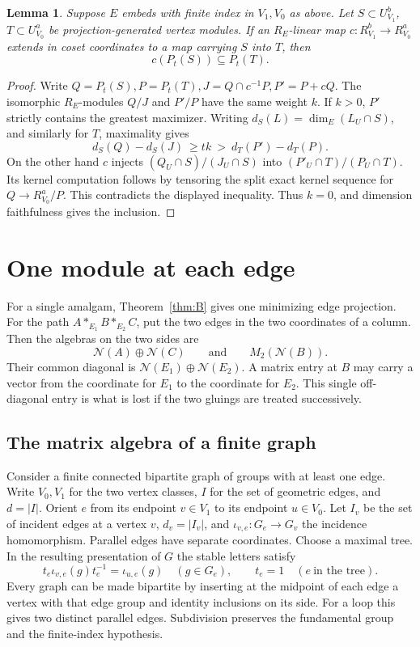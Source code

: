 \documentclass[11pt,a4paper,reqno]{amsart}
\numberwithin{equation}{section}
\newtheorem{lemma}[theorem]{Lemma}
\theoremstyle{remark}
\newcommand{\N}{\mathcal N}
\begin{document}
\begin{lemma}\label{lem:cmp}
Suppose \(E\) embeds with finite index in \(V_1,V_0\) as above. Let \(S\subset U_{V_1}^{b}\), \(T\subset U_{V_0}^{a}\) be projection-generated vertex modules. If an \(R_E\)-linear map \(c:R_{V_1}^{b}\to R_{V_0}^{a}\) extends in coset coordinates to a map carrying \(S\) into \(T\), then
\[
                        c(P_t(S))\subseteq P_t(T).
\]
\end{lemma}
\begin{proof}
Write \(Q=P_t(S), P=P_t(T), J=Q\cap c^{-1}P, P'=P+cQ\). The isomorphic \(R_E\)-modules \(Q/J\) and \(P'/P\) have the same weight \(k\). If \(k>0\), \(P'\) strictly contains the greatest maximizer. Writing \(d_S(L)=\dim_E(L_U\cap S)\), and similarly for \(T\), maximality gives
\[
             d_S(Q)-d_S(J)\ \ge tk\ >\ d_T(P')-d_T(P).
\]
On the other hand \(c\) injects \((Q_U\cap S)/(J_U\cap S)\) into \((P'_U\cap T)/(P_U\cap T)\). Its kernel computation follows by tensoring the split exact kernel sequence for \(Q\to R_{V_0}^a/P\). This contradicts the displayed inequality. Thus \(k=0\), and dimension faithfulness gives the inclusion.
\end{proof}


\section{One module at each edge}\label{sec:graph}
For a single amalgam, Theorem~\ref{thm:B} gives one minimizing edge projection. For the path \(A*_{E_1}B*_{E_2}C\), put the two edges in the two coordinates of a column. Then the algebras on the two sides are
\[
     \N(A)\oplus\N(C)\qquad\text{and}\qquad M_2(\N(B)).
\]
Their common diagonal is \(\N(E_1)\oplus\N(E_2)\). A matrix entry at \(B\) may carry a vector from the coordinate for \(E_1\) to the coordinate for \(E_2\). This single off-diagonal entry is what is lost if the two gluings are treated successively.

\subsection{The matrix algebra of a finite graph}
Consider a finite connected bipartite graph of groups with at least one edge. Write \(V_0,V_1\) for the two vertex classes, \(I\) for the set of geometric edges, and \(d=|I|\). Orient \(e\) from its endpoint \(v\in V_1\) to its endpoint \(u\in V_0\). Let \(I_v\) be the set of incident edges at a vertex \(v\), \(d_v=|I_v|\), and \(\iota_{v,e}:G_e\to G_v\) the incidence homomorphism. Parallel edges have separate coordinates. Choose a maximal tree. In the resulting presentation of \(G\) the stable letters satisfy
\[
   t_e\iota_{v,e}(g)t_e^{-1}=\iota_{u,e}(g)\quad(g\in G_e),
   \qquad t_e=1\quad(e\ \text{in the tree}).
\]
Every graph can be made bipartite by inserting at the midpoint of each edge a vertex with that edge group and identity inclusions on its side. For a loop this gives two distinct parallel edges. Subdivision preserves the fundamental group and the finite-index hypothesis.
\end{document}

